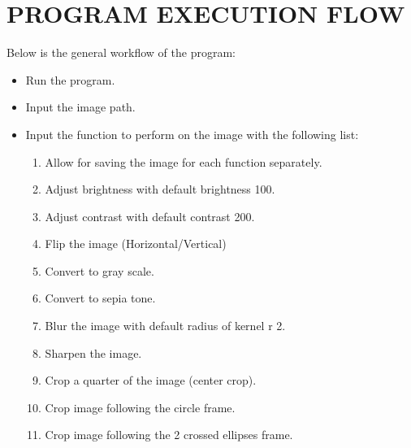 \chapter*{\MakeUppercase{Program execution flow}}

\text Below is the general workflow of the program:
\begin{itemize}
    \item Run the program.
    \item Input the image path.
    \item Input the function to perform on the image with the following list:
    \begin{enumerate}[start=0]
        \item Allow for saving the image for each function separately. 
        \item Adjust brightness with default brightness 100.
        \item Adjust contrast with default contrast 200.
        \item Flip the image (Horizontal/Vertical)
        \item Convert to gray scale.
        \item Convert to sepia tone.
        \item Blur the image with default radius of kernel r 2.
        \item Sharpen the image.
        \item Crop a quarter of the image (center crop).
        \item Crop image following the circle frame.
        \item Crop image following the 2 crossed ellipses frame.
    \end{enumerate}
\end{itemize}